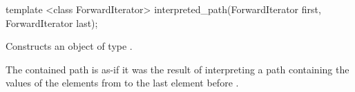 %
\begin{itemdecl}
template <class ForwardIterator>
interpreted_path(ForwardIterator first, ForwardIterator last);
\end{itemdecl}
\begin{itemdescr}
\pnum
\effects
Constructs an object of type .

\pnum
The contained path is as-if it was the result of interpreting a path containing the values of the elements from  to the last element before .
%
%	
\end{itemdescr}
